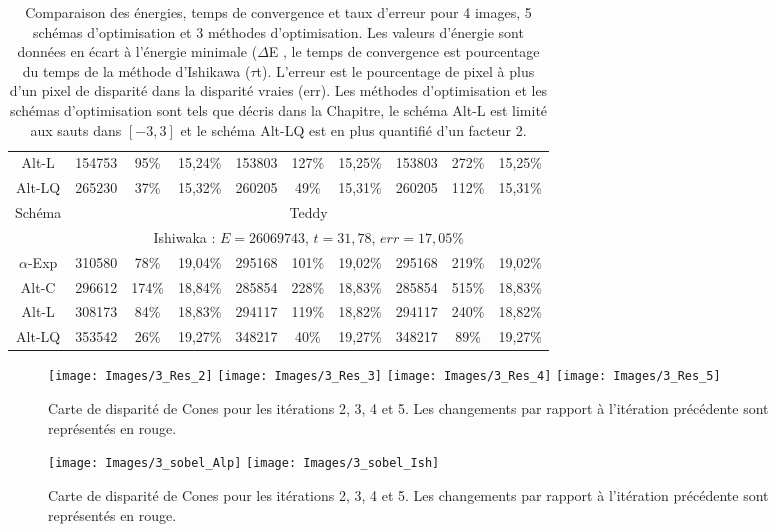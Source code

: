 \documentclass[../main/These_Mathias_Paget.tex]{subfiles}
\begin{document}
\begin{table}
\begin{tabular}{c|ccc|ccc|ccc}
Alt-L & \num{154753}  &  95\%  & 15,24\% & \num{153803} &  127\% & 15,25\% & \num{153803} & 272\% & 15,25\% \\
Alt-LQ & \num{265230}  &  37\%  & 15,32\% & \num{260205} &   49\% & 15,31\% & \num{260205} & 112\% & 15,31\% \\
\hline
\multirow{2}{*}{Schéma} & \multicolumn{9}{c}{Teddy} \\
 & \multicolumn{9}{c}{Ishiwaka : $E=\num{26069743}$, $t=31,78$, $err=17,05\%$} \\
\hline
$\alpha$-Exp & \num{310580}  &  78\%  & 19,04\% & \num{295168} &  101\% & 19,02\% & \num{295168} & 219\% & 19,02\% \\
Alt-C & \num{296612}  & 174\%  & 18,84\% & \num{285854} &  228\% & 18,83\% & \num{285854} & 515\% & 18,83\% \\
Alt-L & \num{308173}  &  84\%  & 18,83\% & \num{294117} &  119\% & 18,82\% & \num{294117} & 240\% & 18,82\% \\
Alt-LQ & \num{353542}  &  26\%  & 19,27\% & \num{348217} &   40\% & 19,27\% & \num{348217} &  89\% & 19,27\% \\
\end{tabular}
\caption{Comparaison des énergies, temps de convergence et taux d'erreur pour 4 images, 5 schémas d'optimisation et 3 méthodes d'optimisation. Les valeurs d’énergie sont données en écart à l’énergie minimale ($\Delta$E , le temps de convergence est pourcentage du temps de la méthode d'Ishikawa ($\tau$t). L'erreur est le pourcentage de pixel à plus d'un pixel de disparité dans la disparité vraies (err). Les méthodes d'optimisation et les schémas d'optimisation sont tels que décris dans la Chapitre, le schéma Alt-L est limité aux sauts dans $[-3,3]$ et le schéma Alt-LQ est en plus quantifié d'un facteur 2.}
\label{tab:stereo_L1}
\end{table}

\begin{figure}
\centering
\texttt{[image: Images/3\_Res\_2]}
\texttt{[image: Images/3\_Res\_3]}
\texttt{[image: Images/3\_Res\_4]}
\texttt{[image: Images/3\_Res\_5]}
\caption{Carte de disparité de Cones pour les itérations 2, 3, 4 et 5. Les changements par rapport à l'itération précédente sont représentés en rouge.}
\end{figure}


\begin{figure}
\centering
\texttt{[image: Images/3\_sobel\_Alp]}
\texttt{[image: Images/3\_sobel\_Ish]}
\caption{Carte de disparité de Cones pour les itérations 2, 3, 4 et 5. Les changements par rapport à l'itération précédente sont représentés en rouge.}
\end{figure}
\end{document}
